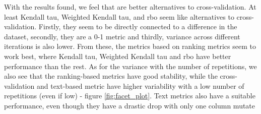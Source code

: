 
With the results found, we feel that are better alternatives to cross-validation. At least  Kendall tau, Weighted Kendall tau, and \ac{rbo} seem like alternatives to cross-validation.
Firstly, they seem to be directly connected to a difference in the dataset, secondly, they are a 0-1 metric and thirdly, variance across different iterations is also lower.
From these, the metrics based on ranking metrics seem to work best, where Kendall tau, Weighted Kendall tau and \ac{rbo} have better performance than the rest. As for the variance with the number of repetitions, we also see that the ranking-based metrics have good stability, while the cross-validation and text-based metric have higher variability with a low number of repetitions (even if low) - figure \ref{fig:facet_plot}. 
Text metrics also have a suitable performance, even though they have a drastic drop with only one column mutate